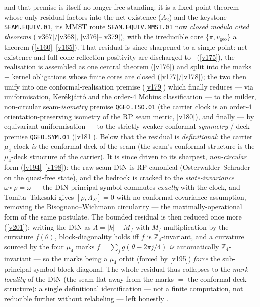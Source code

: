 \documentclass[11pt,a4paper]{article}
\newcommand{\Z}{\mathbb Z}
\begin{document}
\begin{keybox}
and that premise is itself no longer free-standing: it is a fixed-point theorem whose only residual factors
into the net-existence ($A_2$) and the keystone \texttt{SEAM.EQUIV.01}, its MMST route \texttt{SEAM.EQUIV.MMST.01}
now \emph{closed modulo cited theorems}
(\vref{v367}/\vref{v368}, \vref{v376}--\vref{v379}), with the irreducible core
$\{\pi,v_{\mathrm{geo}}\}$ a theorem (\vref{v160}--\vref{v165}). That residual is since sharpened to a
single point: net existence and full-cone reflection positivity are discharged to \mE\
(\vref{v175}), the realisation is assembled as one central theorem (\vref{v176}) and split into the
marks $+$ kernel obligations whose finite cores are closed (\vref{v177}/\vref{v178}); the two then
unify into one conformal-realisation premise (\vref{v179}) which finally reduces --- via uniformisation,
Ker\'ekj\'art\'o and the order-$4$ M\"obius classification --- to the milder, non-circular
seam-\emph{isometry} premise \texttt{QGEO.ISO.01} (the carrier clock is an order-$4$
orientation-preserving isometry of the RP seam metric, \vref{v180}), and finally --- by equivariant
uniformisation --- to the strictly weaker conformal-\emph{symmetry} / deck premise \texttt{QGEO.SYM.01}
(\vref{v181}). Below that the residual is \emph{definitional}: the carrier $\mu_4$ clock \emph{is} the
conformal deck of the seam (the seam's conformal structure is the $\mu_4$-deck structure of the carrier).
It is since driven to its sharpest, \emph{non-circular} form (\vref{v194}--\vref{v198}): the raw seam DtN
is RP-canonical (Osterwalder--Schrader on the quasi-free state), and the bedrock is cracked to the
\emph{state-invariance} $\omega\circ\rho=\omega$ --- the DtN principal symbol commutes \emph{exactly} with
the clock, and Tomita--Takesaki gives $[\rho,\Lambda_\Sigma]=0$ with no conformal-covariance assumption,
removing the Bisognano--Wichmann circularity --- the maximally-operational form of the same postulate.
The bounded residual is then reduced once more (\vref{v201}): writing the DtN as $\Lambda=|k|+M_f$ with
$M_f$ multiplication by the curvature $f(\theta)$, block-diagonality holds iff $f$ is $\Z_4$-invariant, and a
curvature sourced by the four $\mu_4$ marks $f=\sum_{j}g(\theta-2\pi j/4)$ \emph{is} automatically
$\Z_4$-invariant --- so the marks being a $\mu_4$ orbit (forced by \vref{v195}) \emph{force} the
sub-principal symbol block-diagonal. The whole residual thus collapses to the \emph{mark-locality} of the
DtN (the seam flat away from the marks $=$ the conformal-deck structure): a single definitional
identification --- not a finite computation, not reducible further without relabeling --- left honestly \mO.

\end{keybox}
\end{document}
